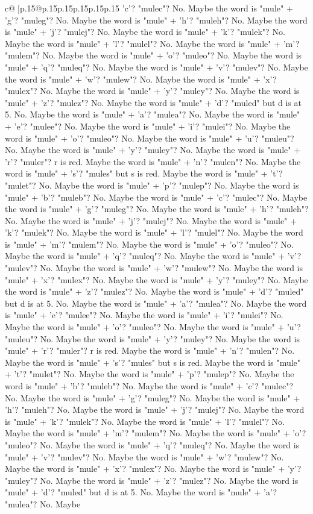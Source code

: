 \documentclass{article}
\begin{document}
{\begin{supertabular}{c@{$\;$}|p{.15\linewidth}@{}p{.15\linewidth}p{.15\linewidth}p{.15\linewidth}p{.15\linewidth}p{.15\linewidth}}
{{{'c'? "mulec"? No. Maybe the word is "mule" + 'g'? "muleg"? No. Maybe the word is "mule" + 'h'? "muleh"? No. Maybe the word is "mule" + 'j'? "mulej"? No. Maybe the word is "mule" + 'k'? "mulek"? No. Maybe the word is "mule" + 'l'? "mulel"? No. Maybe the word is "mule" + 'm'? "mulem"? No. Maybe the word is "mule" + 'o'? "muleo"? No. Maybe the word is "mule" + 'q'? "muleq"? No. Maybe the word is "mule" + 'v'? "mulev"? No. Maybe the word is "mule" + 'w'? "mulew"? No. Maybe the word is "mule" + 'x'? "mulex"? No. Maybe the word is "mule" + 'y'? "muley"? No. Maybe the word is "mule" + 'z'? "mulez"? No. Maybe the word is "mule" + 'd'? "muled" but d is at 5. No. Maybe the word is "mule" + 'a'? "mulea"? No. Maybe the word is "mule" + 'e'? "mulee"? No. Maybe the word is "mule" + 'i'? "mulei"? No. Maybe the word is "mule" + 'o'? "muleo"? No. Maybe the word is "mule" + 'u'? "muleu"? No. Maybe the word is "mule" + 'y'? "muley"? No. Maybe the word is "mule" + 'r'? "muler"? r is red. Maybe the word is "mule" + 'n'? "mulen"? No. Maybe the word is "mule" + 's'? "mules" but s is red. Maybe the word is "mule" + 't'? "mulet"? No. Maybe the word is "mule" + 'p'? "mulep"? No. Maybe the word is "mule" + 'b'? "muleb"? No. Maybe the word is "mule" + 'c'? "mulec"? No. Maybe the word is "mule" + 'g'? "muleg"? No. Maybe the word is "mule" + 'h'? "muleh"? No. Maybe the word is "mule" + 'j'? "mulej"? No. Maybe the word is "mule" + 'k'? "mulek"? No. Maybe the word is "mule" + 'l'? "mulel"? No. Maybe the word is "mule" + 'm'? "mulem"? No. Maybe the word is "mule" + 'o'? "muleo"? No. Maybe the word is "mule" + 'q'? "muleq"? No. Maybe the word is "mule" + 'v'? "mulev"? No. Maybe the word is "mule" + 'w'? "mulew"? No. Maybe the word is "mule" + 'x'? "mulex"? No. Maybe the word is "mule" + 'y'? "muley"? No. Maybe the word is "mule" + 'z'? "mulez"? No. Maybe the word is "mule" + 'd'? "muled" but d is at 5. No. Maybe the word is "mule" + 'a'? "mulea"? No. Maybe the word is "mule" + 'e'? "mulee"? No. Maybe the word is "mule" + 'i'? "mulei"? No. Maybe the word is "mule" + 'o'? "muleo"? No. Maybe the word is "mule" + 'u'? "muleu"? No. Maybe the word is "mule" + 'y'? "muley"? No. Maybe the word is "mule" + 'r'? "muler"? r is red. Maybe the word is "mule" + 'n'? "mulen"? No. Maybe the word is "mule" + 's'? "mules" but s is red. Maybe the word is "mule" + 't'? "mulet"? No. Maybe the word is "mule" + 'p'? "mulep"? No. Maybe the word is "mule" + 'b'? "muleb"? No. Maybe the word is "mule" + 'c'? "mulec"? No. Maybe the word is "mule" + 'g'? "muleg"? No. Maybe the word is "mule" + 'h'? "muleh"? No. Maybe the word is "mule" + 'j'? "mulej"? No. Maybe the word is "mule" + 'k'? "mulek"? No. Maybe the word is "mule" + 'l'? "mulel"? No. Maybe the word is "mule" + 'm'? "mulem"? No. Maybe the word is "mule" + 'o'? "muleo"? No. Maybe the word is "mule" + 'q'? "muleq"? No. Maybe the word is "mule" + 'v'? "mulev"? No. Maybe the word is "mule" + 'w'? "mulew"? No. Maybe the word is "mule" + 'x'? "mulex"? No. Maybe the word is "mule" + 'y'? "muley"? No. Maybe the word is "mule" + 'z'? "mulez"? No. Maybe the word is "mule" + 'd'? "muled" but d is at 5. No. Maybe the word is "mule" + 'a'? "mulea"? No. Maybe }}}
\end{supertabular}}
\end{document}
